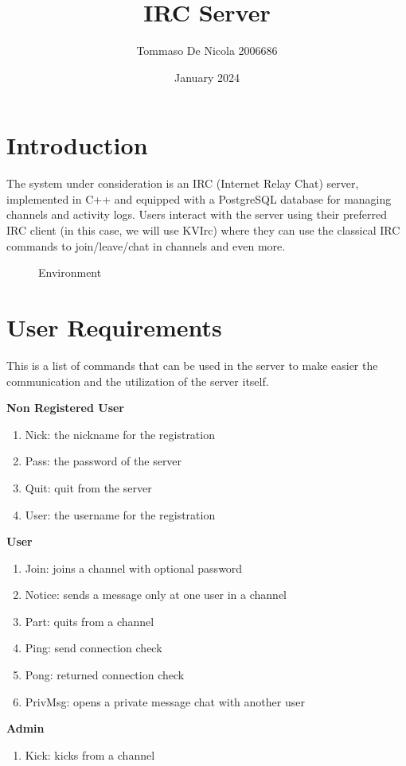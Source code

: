 \documentclass{article}
\title{IRC Server}
\author{Tommaso De Nicola 2006686}
\date{January 2024}
\begin{document}
\maketitle

\section{Introduction}
\fontsize{12pt}{14pt}\selectfont
The system under consideration is an IRC (Internet Relay Chat) server, implemented in C++ and equipped with a PostgreSQL database for managing channels and activity logs. Users interact with the server using their preferred IRC client (in this case, we will use KVIrc) where they can use the classical IRC commands to join/leave/chat in channels and even more.

\vspace{12pt}

\begin{figure}[ht]
    \centering
    
    \caption{Environment}
    \label{fig:environment.svg}
\end{figure}

\newpage


\section{User Requirements}

This is a list of commands that can be used in the server to make easier the communication and the utilization of the server itself.
\vspace{12pt}

\textbf{Non Registered User}
\begin{enumerate}
    \item Nick: the nickname for the registration
    \item Pass: the password of the server
    \item Quit: quit from the server
    \item User: the username for the registration
\end{enumerate}
\textbf{User}
\begin{enumerate}
    \item Join: joins a channel with optional password
    \item Notice: sends a message only at one user in a channel
    \item Part: quits from a channel
    \item Ping: send connection check
    \item Pong: returned connection check
    \item PrivMsg: opens a private message chat with another user
\end{enumerate}
\textbf{Admin}
\begin{enumerate}
    \item Kick: kicks from a channel
\end{enumerate}
\end{document}
